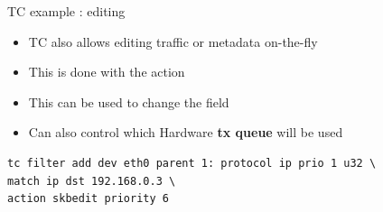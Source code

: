 \begin{frame}[fragile]{TC example : editing}
	\begin{itemize}
		\item TC also allows editing traffic or metadata on-the-fly
		\item This is done with the  action
		\item This can be used to change the  field
		\item Can also control which Hardware \textbf{tx queue} will be used
	\end{itemize}
	\begin{verbatim}
tc filter add dev eth0 parent 1: protocol ip prio 1 u32 \
match ip dst 192.168.0.3 \
action skbedit priority 6
	\end{verbatim}
\end{frame}

